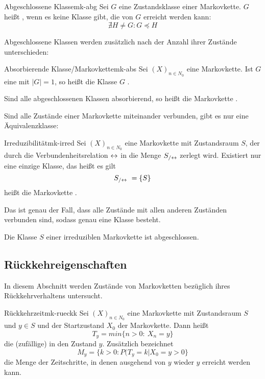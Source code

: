 \begin{definition}{Abgeschlossene Klasse}{mk-abg}
Sei $G$ eine Zustandsklasse einer Markovkette. $G$ heißt ,
wenn es keine Klasse gibt, die von $G$ erreicht werden kann:
\[
\nexists H\ne G: G\preceq H
\]
\end{definition}

Abgeschlossene Klassen werden zusätzlich nach der Anzahl ihrer Zustände
unterschieden:

\begin{definition}{Absorbierende Klasse/Markovkette}{mk-abs}
Sei $(X)_{n\in N_0}$ eine Markovkette. Ist $G$ eine 
mit $|G|=1$, so heißt die Klasse $G$ .

Sind alle abgeschlossenen Klassen absorbierend, so heißt die
Markovkette .
\end{definition}

Sind alle Zustände einer Markovkette miteinander verbunden, gibt es nur eine
Äquivalenzklasse:
\begin{definition}{Irreduzibilität}{mk-irred}
Sei $(X)_{n\in N_0}$ eine Markovkette mit Zustandsraum $S$, der durch die
Verbundenheitsrelation $\leftrightarrow$ in die Menge $S_{/\leftrightarrow}$ zerlegt wird. Existiert nur
eine einzige Klasse, das heißt es gilt
\[
S_{/\lr}\ = \{S\}
\]
heißt die Markovkette .
\end{definition}

Das ist genau der Fall, dass alle Zustände mit allen anderen Zuständen verbunden
sind, sodass genau eine Klasse besteht.

\begin{lemma}
Die Klasse $S$ einer irreduziblen Markovkette ist abgeschlossen.
\end{lemma}
 
\subsection{Rückkehreigenschaften}

In diesem Abschnitt werden Zustände von Markovketten bezüglich ihres
Rückkehrverhaltens untersucht.

\begin{definition}{Rückkehrzeit}{mk-rueckk}
Sei $(X)_{n\in N_0}$ eine Markovkette mit Zustandsraum $S$ und $y\in S$
 und der Startzustand $X_0$ der Markovkette.
Dann heißt
\[
T_y = min\{n>0:\ X_n = y\}
\]
die (zufällige)  in den Zustand $y$. Zusätzlich bezeichnet
\[
M_y = \{k>0: P(T_y=k|X_0=y > 0\}
\]
die Menge der Zeitschritte, in denen ausgehend von $y$ wieder $y$ erreicht
werden kann.
\end{definition}

